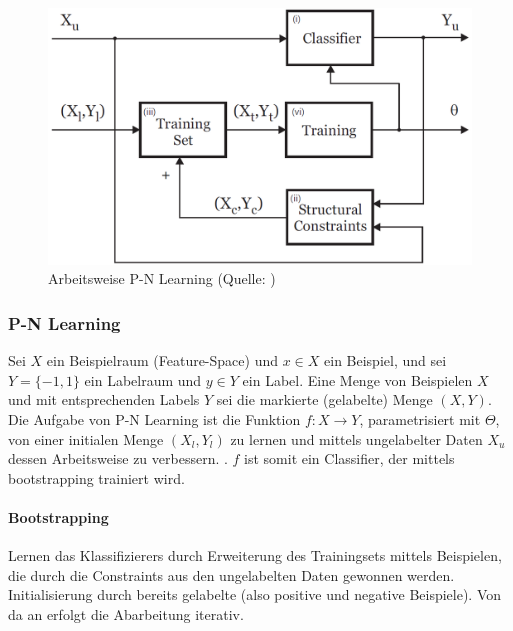 	\begin{figure}
	\begin{centering}
	\includegraphics[scale=0.4]{../pictures/PN_LEARNING.png}\caption{Arbeitsweise P-N Learning (Quelle: \cite{PNL})}
	\label{PNL_Pic}
	\par\end{centering}
	\end{figure}

	\subsubsection{P-N Learning}

	Sei $X$ ein Beispielraum (Feature-Space) und $x\in X$ ein Beispiel, und sei $Y=\{-1,1\}$ ein Labelraum und $y\in Y$ ein Label. Eine Menge von Beispielen $X$ und mit entsprechenden Labels $Y$ sei die markierte (gelabelte) Menge $(X,Y)$. Die Aufgabe von P-N Learning ist die Funktion $f:X\rightarrow Y$, parametrisiert mit $\Theta$, von einer initialen Menge $(X_{l},Y_{l})$ zu lernen und mittels ungelabelter Daten $X_{u}$ dessen Arbeitsweise zu verbessern. . $f$ ist somit ein Classifier, der mittels bootstrapping trainiert wird.

	\paragraph{Bootstrapping}
	Lernen das Klassifizierers durch Erweiterung des Trainingsets mittels Beispielen, die durch die Constraints aus den ungelabelten Daten gewonnen werden. Initialisierung durch bereits gelabelte (also positive und negative Beispiele). Von da an erfolgt die Abarbeitung iterativ.

